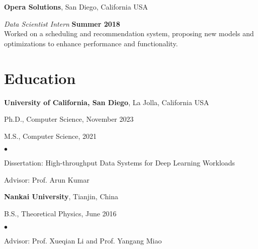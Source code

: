 \documentclass[margin,line]{res}
\newenvironment{list1}{
 \begin{list}{\ding{113}}{%
   \setlength{\itemsep}{0in}
   \setlength{\parsep}{0in} \setlength{\parskip}{0in}
   \setlength{\topsep}{0in} \setlength{\partopsep}{0in} 
   \setlength{\leftmargin}{0.17in}}}{\end{list}}
\newenvironment{list2}{
 \begin{list}{$\bullet$}{%
   \setlength{\itemsep}{0in}
   \setlength{\parsep}{0in} \setlength{\parskip}{0in}
   \setlength{\topsep}{0in} \setlength{\partopsep}{0in} 
   \setlength{\leftmargin}{0.2in}}}{\end{list}}
\begin{document}
\begin{resume}
{\bf Opera Solutions}, San Diego, California USA

\vspace{-.3cm}
{\em Data Scientist Intern} \hfill {\bf Summer 2018}\\
Worked on a scheduling and recommendation system, proposing new models and optimizations to enhance performance and functionality.

\section{\sc Education}
{\bf University of California, San Diego}, La Jolla, California USA\\
\vspace*{-.1in}
\begin{list1}
\item[] Ph.D., Computer Science, November 2023
\item[] M.S., Computer Science, 2021
\begin{list2}
\vspace*{.05in}
\item Dissertation: High-throughput Data Systems for Deep Learning Workloads
\item Advisor: Prof. Arun Kumar
\end{list2}
\end{list1}

{\bf Nankai University}, Tianjin, China\\
\vspace*{-.1in}
\begin{list1}
\item[] B.S., Theoretical Physics, June 2016
\begin{list2}
\item Advisor: Prof. Xueqian Li and Prof. Yangang Miao
\end{list2}
\end{list1}



\end{resume}
\end{document}
